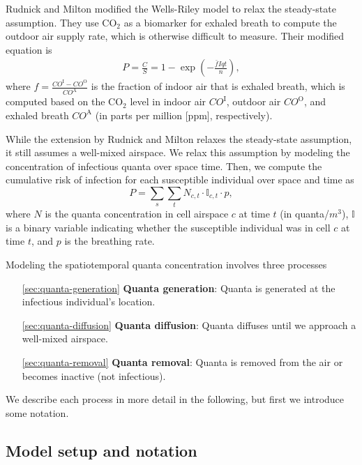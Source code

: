 \documentclass[fleqn,11pt]{wlscirep_supp}
\begin{document}
Rudnick and Milton\cite{Rudnick2003IndoorAir} modified the Wells-Riley model to relax the steady-state assumption. They use CO$_2$ as a biomarker for exhaled breath to compute the outdoor air supply rate, which is otherwise difficult to measure. Their modified equation is
\begin{align}
    P = \frac{C}{S} = 1 - \exp \left(-\frac{\bar{f}Iqt}{n}\right),
\end{align}
where $f = \frac{CO^{\text{I}}-CO^{\text{O}}}{CO^{\text{A}}}$ is the fraction of indoor air that is exhaled breath, which is computed based on the CO$_2$ level in indoor air $CO^{\text{I}}$, outdoor air $CO^{\text{O}}$, and exhaled breath $CO^{\text{A}}$ (in parts per million [ppm], respectively). 

While the extension by Rudnick and Milton relaxes the steady-state assumption, it still assumes a well-mixed airspace. We relax this assumption by modeling the concentration of infectious quanta over space time. Then, we compute the cumulative risk of infection for each susceptible individual over space and time as 
\begin{equation}\label{eq:spattemp-P}
    P = \sum_s \sum_t N_{c,t} \cdot \mathbb{I}_{c,t} \cdot p,
\end{equation}
where $N$ is the quanta concentration in cell airspace $c$ at time $t$ (in quanta/$m^3$), $\mathbb{I}$ is a binary variable indicating whether the susceptible individual was in cell $c$ at time $t$, and $p$ is the breathing rate. 

Modeling the spatiotemporal quanta concentration involves three processes
\begin{itemize}
    \item[\ref{sec:quanta-generation}] \textbf{Quanta generation}: Quanta is generated at the infectious individual's location. 
    \item[\ref{sec:quanta-diffusion}] \textbf{Quanta diffusion}: Quanta diffuses until we approach a well-mixed airspace. 
    \item[\ref{sec:quanta-removal}] \textbf{Quanta removal}: Quanta is removed from the air or becomes inactive (not infectious). 
\end{itemize}
We describe each process in more detail in the following, but first we introduce some notation. 

\subsection{Model setup and notation}
\end{document}
